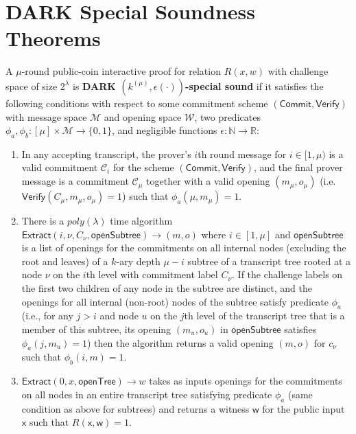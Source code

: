 \section{DARK Special Soundness Theorems} 
\begin{definition}\label{def:darkspecialsoundness} A $\mu$-round public-coin interactive proof for relation $R(x,w)$ with challenge space of size $2^\lambda$ is \textbf{DARK $(k^{(\mu)}, \epsilon(\cdot))$-special sound} if it satisfies the following conditions with respect to some commitment scheme $(\textsf{Commit}, \textsf{Verify})$ with message space $\mathcal{M}$ and opening space $\mathcal{W}$, two predicates $\phi_a, \phi_b:[\mu] \times \mathcal{M}  \rightarrow \{0,1\}$, and negligible functions $\epsilon: \mathbb{N} \rightarrow \mathbb{R}$:


\begin{enumerate} 
\item  In any accepting transcript, the prover's $i$th round message for $i \in [1,\mu)$ is a valid commitment $\mathcal{C}_i$ for the scheme $(\textsf{Commit}, \textsf{Verify})$, and the final prover message is a commitment $\mathcal{C}_\mu$ together with a valid opening $(m_\mu, o_\mu)$ (i.e. $\textsf{Verify}(C_\mu, m_\mu, o_\mu) = 1$) such that $\phi_a(\mu, m_\mu) = 1$. 


\item  There is a $poly(\lambda)$ time algorithm $\textsf{Extract}(i, \nu, C_\nu, \textsf{openSubtree}) \rightarrow (m, o)$ where $i \in [1,\mu]$ and $\textsf{openSubtree}$ is a list of openings for the commitments on all internal nodes (excluding the root and leaves) of a $k$-ary depth $\mu - i$ subtree of a transcript tree rooted at a node $\nu$ on the $i$th level with commitment label $C_\nu$. If the challenge labels on the first two children of any node in the subtree are distinct, and the openings for all internal (non-root) nodes of the subtree satisfy predicate $\phi_a$ (i.e., for any $j > i$ and node $u$ on the $j$th level of the transcript tree that is a member of this subtree, its opening $(m_u, o_u)$ in $\textsf{openSubtree}$ satisfies $\phi_a(j, m_u)= 1$) then the algorithm returns a valid opening $(m,o)$ for $c_\nu$ such that $\phi_b(i, m) = 1$.  

\item  $\textsf{Extract}(0,x,\textsf{openTree}) \rightarrow w$ takes as inputs openings for the commitments on all nodes in an entire transcript tree satisfying predicate $\phi_a$ (same condition as above for subtrees) and returns a witness $\mathsf{w}$ for the public input $\mathsf{x}$ such that $R(\mathsf{x},\mathsf{w})=1$. 


\end{enumerate}
\end{definition}
